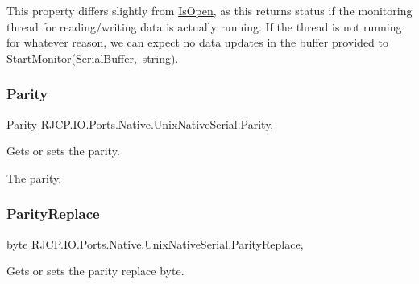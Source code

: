 This property differs slightly from \mbox{\hyperlink{class_r_j_c_p_1_1_i_o_1_1_ports_1_1_native_1_1_unix_native_serial_a1ad7c5fb46d22ac194b1f0f63c4e67bf}{Is\+Open}}, as this returns status if the monitoring thread for reading/writing data is actually running. If the thread is not running for whatever reason, we can expect no data updates in the buffer provided to \mbox{\hyperlink{class_r_j_c_p_1_1_i_o_1_1_ports_1_1_native_1_1_unix_native_serial_a1dff48491b2421e1310acdab46d80fbb}{Start\+Monitor(\+Serial\+Buffer, string)}}. \mbox{\label{class_r_j_c_p_1_1_i_o_1_1_ports_1_1_native_1_1_unix_native_serial_a6d3b4b098c8c0ea5a40f6410b15341c5}} 
\subsubsection{\texorpdfstring{Parity}{Parity}}
{\footnotesize\ttfamily \mbox{\hyperlink{namespace_r_j_c_p_1_1_i_o_1_1_ports_a35c8c760a80dd0392e605dd3ad169954}{Parity}} R\+J\+C\+P.\+I\+O.\+Ports.\+Native.\+Unix\+Native\+Serial.\+Parity\hspace{0.3cm}{\ttfamily [get]}, {\ttfamily [set]}}



Gets or sets the parity. 

The parity. \mbox{\label{class_r_j_c_p_1_1_i_o_1_1_ports_1_1_native_1_1_unix_native_serial_a8a436dac22c906ab97f07ca517e060dd}} 
\subsubsection{\texorpdfstring{ParityReplace}{ParityReplace}}
{\footnotesize\ttfamily byte R\+J\+C\+P.\+I\+O.\+Ports.\+Native.\+Unix\+Native\+Serial.\+Parity\+Replace\hspace{0.3cm}{\ttfamily [get]}, {\ttfamily [set]}}



Gets or sets the parity replace byte. 

